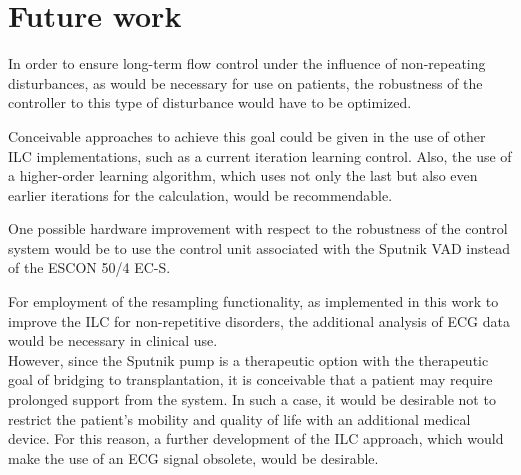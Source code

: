 \section{Future work}
In order to ensure long-term flow control under the influence of non-repeating disturbances, as would be necessary for use on patients, the robustness of the controller to this type of disturbance would have to be optimized.

Conceivable approaches to achieve this goal could be given in the use of other ILC implementations, such as a current iteration learning control. Also, the use of a higher-order learning algorithm, which uses not only the last but also even earlier iterations for the calculation, would be recommendable.

One possible hardware improvement with respect to the robustness of the control system would be to use the control unit associated with the Sputnik VAD instead of the ESCON 50/4 EC-S.

For employment of the resampling functionality, as implemented in this work to improve the ILC for non-repetitive disorders, the additional analysis of ECG data would be necessary in clinical use.
\\However, since the Sputnik pump is a therapeutic option with the therapeutic goal of bridging to transplantation, it is conceivable that a patient may require prolonged support from the system. In such a case, it would be desirable not to restrict the patient's mobility and quality of life with an additional medical device. For this reason, a further development of the ILC approach, which would make the use of an ECG signal obsolete, would be desirable.
